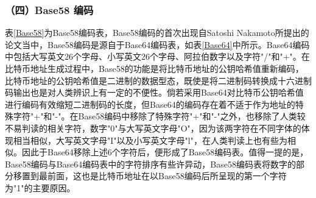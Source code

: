 				

					

				\subsubsection{（四）Base58 编码}

				表\ref{Base58}为Base58编码表，Base58编码的首次出现自Satoshi Nakamoto所提出的论文\supercite{bitcoinpaper}当中，Base58编码是源自于Base64编码表，如表\ref{Base64}中所示。Base64编码中包括大写英文26个字母、小写英文26个字母、阿拉伯数字以及字符"/"和"+"。在比特币地址生成过程中，Base58的功能是将比特币地址的公钥哈希值重新编码，比特币地址的公钥哈希值是二进制的数据型态，既使是将二进制码转换成十六进制码输出也是对人类辨识上有一定的不便性。倘若采用Base64对比特币公钥哈希值进行编码有效缩短二进制码的长度，但Base64的编码存在着不适于作为地址的特殊字符"+"和"-"。在Base58编码中移除了特殊字符"+"和"-"之外，也移除了⼈类较不易判读的相关字符，数字"0"与大写英文字母"O"，因为该两字符在不同字体的体现相当相似，大写英文字母"I"以及小写英文字母"l"，在人类判读上也有些为相似。因此于Base64移除上述6个字符后，便形成了Base58编码表。值得一提的是，Base58编码与Base64编码表中的字符排序有些许异动，Base58编码表将数字的部分移置到最前面，这也是比特币地址在以Base58编码后所呈现的第一个字符为"1"的主要原因。

